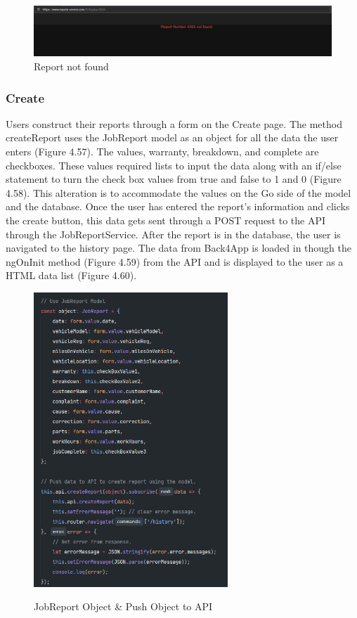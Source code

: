 \begin{figure}[H]
    \caption{Report not found}
    \label{image:ReportNotFound}
    \centering
    \includegraphics[width=1.0\textwidth]{images/repota/UI/report_not_found.png}
\end{figure}

\subsubsection{Create}
Users construct their reports through a form on the Create page. The method createReport uses the JobReport model as an object for all the data the user enters (Figure 4.57). The values, warranty, breakdown, and complete are checkboxes. These values required lists to input the data along with an if/else statement to turn the check box values from true and false to 1 and 0 (Figure 4.58). This alteration is to accommodate the values on the Go side of the model and the database. Once the user has entered the report's information and clicks the create button, this data gets sent through a POST request to the API through the JobReportService. After the report is in the database, the user is navigated to the history page. The data from Back4App is loaded in though the ngOnInit method (Figure 4.59) from the API and is displayed to the user as a HTML data list (Figure 4.60).  

\begin{figure}[H]
    \centering
    \caption{JobReport Object \& Push Object to API}
    \includegraphics[width=0.65\textwidth]{images/repota/report_pages/create_2.png}
    \label{image:createReportObject}
    \centering
\end{figure}

